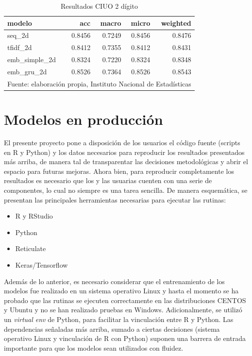 \documentclass[
  12pt,
  spanish,
]{article}
\providecommand{\tightlist}{%
  \setlength{\itemsep}{0pt}\setlength{\parskip}{0pt}}
\begin{document}
\begin{table}[H]

\caption{\label{tab:unnamed-chunk-2}Resultados CIUO 2 dígito}
\centering
\fontsize{9.5}{11.5}\selectfont
\begin{tabular}[t]{lrrrr}
\toprule
modelo & acc & macro & micro & weighted\\
\midrule
seq\_2d & 0.8456 & 0.7249 & 0.8456 & 0.8476\\
tfidf\_2d & 0.8412 & 0.7355 & 0.8412 & 0.8431\\
emb\_simple\_2d & 0.8324 & 0.7220 & 0.8324 & 0.8348\\
emb\_gru\_2d & 0.8526 & 0.7364 & 0.8526 & 0.8543\\
\bottomrule
\multicolumn{5}{l}{\rule{0pt}{1em}Fuente: elaboración propia, Instituto Nacional de Estadísticas }\\
\end{tabular}
\end{table}

\newpage

\hypertarget{modelos-en-producciuxf3n}{%
\section{Modelos en producción}\label{modelos-en-producciuxf3n}}

El presente proyecto pone a disposición de los usuarios el código fuente
(scripts en R y Python) y los datos necesarios para reproducir los
resultados presentados más arriba, de manera tal de transparentar las
decisiones metodológicas y abrir el espacio para futuras mejoras. Ahora
bien, para reproducir completamente los resultados es necesario que los
y las usuarias cuenten con una serie de componentes, lo cual no siempre
es una tarea sencilla. De manera esquemática, se presentan las
principales herramientas necesarias para ejecutar las rutinas:

\begin{itemize}
\tightlist
\item
  R y RStudio
\item
  Python
\item
  Reticulate
\item
  Keras/Tensorflow
\end{itemize}

Además de lo anterior, es necesario considerar que el entrenamiento de
los modelos fue realizado en un sistema operativo Linux y hasta el
momento se ha probado que las rutinas se ejecuten correctamente en las
distribuciones CENTOS y Ubuntu y no se han realizado pruebas en Windows.
Adicionalmente, se utilizó un \emph{virtual env} de Python, para
facilitar la vinculación entre R y Python. Las dependencias señaladas
más arriba, sumado a ciertas decisiones (sistema operativo Linux y
vinculación de R con Python) suponen una barrera de entrada importante
para que los modelos sean utilizados con fluidez.
\end{document}

